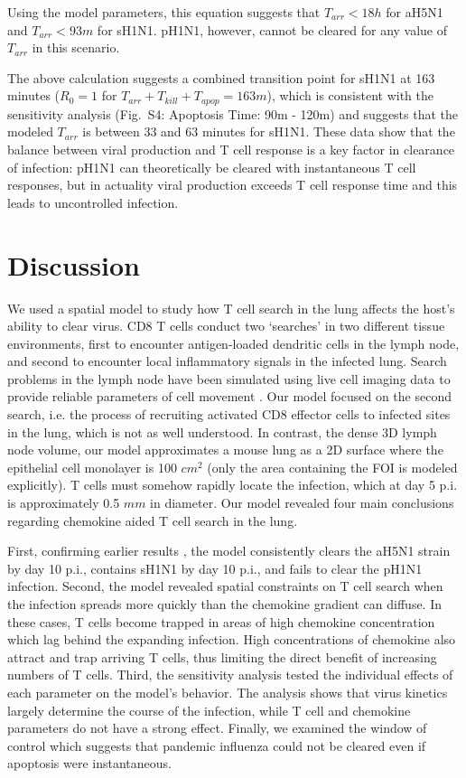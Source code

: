 \documentclass[10pt]{article}
\begin{document}
Using the model parameters, this equation suggests that $T_{arr} < 18h$ for aH5N1 and $T_{arr} < 93m$ for sH1N1.  pH1N1, however, cannot be cleared for any value of $T_{arr}$ in this scenario.  

The above calculation suggests a combined transition point for sH1N1 at 163 minutes ($R_0 = 1$ for $T_{arr}+T_{kill}+T_{apop}=163m$), which is consistent with the sensitivity analysis (Fig.~S4: Apoptosis Time: 90m - 120m) and suggests that the modeled $T_{arr}$ is between 33 and 63 minutes for sH1N1.  These data show that the balance between viral production and T cell response is a key factor in clearance of infection: pH1N1 can theoretically be cleared with instantaneous T cell responses, but in actuality viral production exceeds T cell response time and this leads to uncontrolled infection.


\section*{Discussion}

We used a spatial model to study how T cell search in the lung affects the host's ability to clear virus.  CD8 T cells conduct two `searches' in two different tissue environments, first to encounter antigen-loaded dendritic cells in the lymph node, and second to encounter local inflammatory signals in the infected lung.  Search problems in the lymph node have been simulated using live cell imaging data to provide reliable parameters of cell movement \cite{Vroomans2012}.  Our model focused on the second search, i.e. the process of recruiting activated CD8 effector cells to infected sites in the lung, which is not as well understood.  In contrast, the dense 3D lymph node volume, our model approximates a mouse lung as a 2D surface where the epithelial cell monolayer is 100 $cm^2$ (only the area containing the FOI is modeled explicitly).  T cells must somehow rapidly locate the infection, which at day 5 p.i. is approximately 0.5 $mm$ in diameter.  Our model revealed four main conclusions regarding chemokine aided T cell search in the lung.

First, confirming earlier results \cite{Mitchell2011}, the model consistently clears the aH5N1 strain by day 10 p.i., contains sH1N1 by day 10 p.i., and fails to clear the pH1N1 infection.  Second, the model revealed spatial constraints on T cell search when the infection spreads more quickly than the chemokine gradient can diffuse.  In these cases, T cells become trapped in areas of high chemokine concentration which lag behind the expanding infection.  High concentrations of chemokine also attract and trap arriving T cells, thus limiting the direct benefit of increasing numbers of T cells. Third, the sensitivity analysis tested the individual effects of each parameter on the model's behavior.  The analysis shows that virus kinetics largely determine the course of the infection, while T cell and chemokine parameters do not have a strong effect.  Finally, we examined the window of control which suggests that pandemic influenza could not be cleared even if apoptosis were instantaneous.  
\end{document}
